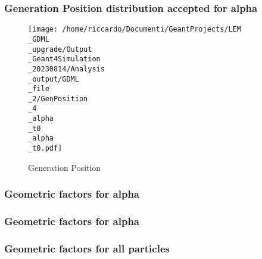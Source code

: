 \documentclass[8pt]{beamer}
\begin{document}
            \begin{frame}
                \frametitle{Generation Position distribution accepted for alpha}
            
        \begin{figure}[h]
            \centering
            \texttt{[image: /home/riccardo/Documenti/GeantProjects/LEM\\\_GDML\\\_upgrade/Output\\\_Geant4Simulation\\\_20230814/Analysis\\\_output/GDML\\\_file\\\_2/GenPosition\\\_4\\\_alpha\\\_t0\\\_alpha\\\_t0.pdf]}
            \caption{Generation Position}
        \end{figure}
        
            \end{frame}
            
            \begin{frame}
                \frametitle{Geometric factors for alpha}
            
            \end{frame}
            
            \begin{frame}
                \frametitle{Geometric factors for alpha}
            
            \end{frame}
            
            \begin{frame}
                \frametitle{Geometric factors for all particles}
            
            \end{frame}
            
        
\end{document}
